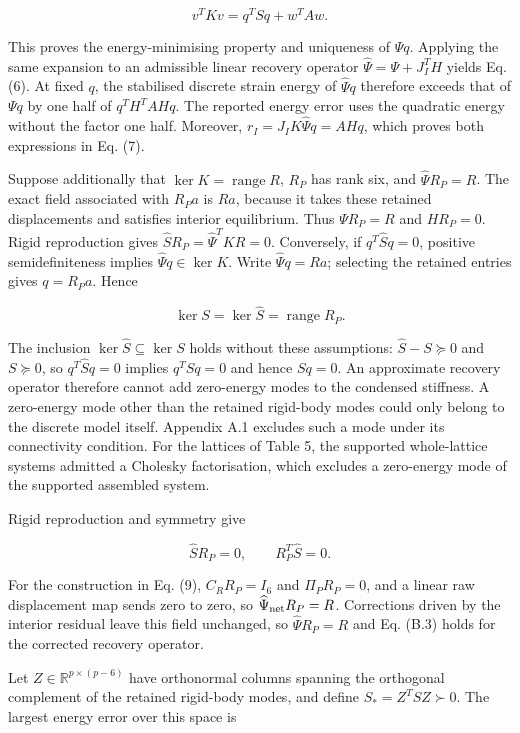\documentclass[preprint,12pt,authoryear]{elsarticle}
\begin{document}
\[
v^TKv=q^TSq+w^TAw.
\tag{B.1}
\]

This proves the energy-minimising property and uniqueness of \(\Psi q\). Applying the same expansion to an admissible linear recovery operator \(\widehat\Psi=\Psi+J_I^TH\) yields Eq. (6). At fixed \(q\), the stabilised discrete strain energy of \(\widehat\Psi q\) therefore exceeds that of \(\Psi q\) by one half of \(q^TH^TAHq\). The reported energy error uses the quadratic energy without the factor one half. Moreover, \(r_I=J_IK\widehat\Psi q=AHq\), which proves both expressions in Eq. (7).

Suppose additionally that \(\ker K=\operatorname{range}R\), \(R_P\) has rank six, and \(\widehat\Psi R_P=R\). The exact field associated with \(R_Pa\) is \(Ra\), because it takes these retained displacements and satisfies interior equilibrium. Thus \(\Psi R_P=R\) and \(HR_P=0\). Rigid reproduction gives \(\widehat S R_P=\widehat\Psi^TKR=0\). Conversely, if \(q^T\widehat S q=0\), positive semidefiniteness implies \(\widehat\Psi q\in\ker K\). Write \(\widehat\Psi q=Ra\); selecting the retained entries gives \(q=R_Pa\). Hence

\[
\ker S=\ker\widehat S=\operatorname{range}R_P.
\tag{B.2}
\]

The inclusion \(\ker\widehat S\subseteq\ker S\) holds without these assumptions: \(\widehat S-S\succeq0\) and \(S\succeq0\), so \(q^T\widehat Sq=0\) implies \(q^TSq=0\) and hence \(Sq=0\). An approximate recovery operator therefore cannot add zero-energy modes to the condensed stiffness. A zero-energy mode other than the retained rigid-body modes could only belong to the discrete model itself. Appendix A.1 excludes such a mode under its connectivity condition. For the lattices of Table 5, the supported whole-lattice systems admitted a Cholesky factorisation, which excludes a zero-energy mode of the supported assembled system.

Rigid reproduction and symmetry give

\[
\widehat S R_P=0,\qquad R_P^T\widehat S=0.
\tag{B.3}
\]

For the construction in Eq. (9), \(C_RR_P=I_6\) and \(\Pi_PR_P=0\), and a linear raw displacement map sends zero to zero, so \(\widehat\Psi_{\rm net}R_P=R\). Corrections driven by the interior residual leave this field unchanged, so \(\widehat\Psi R_P=R\) and Eq. (B.3) holds for the corrected recovery operator.

Let \(Z\in\mathbb R^{p\times(p-6)}\) have orthonormal columns spanning the orthogonal complement of the retained rigid-body modes, and define \(S_*=Z^TSZ\succ0\). The largest energy error over this space is
\end{document}
